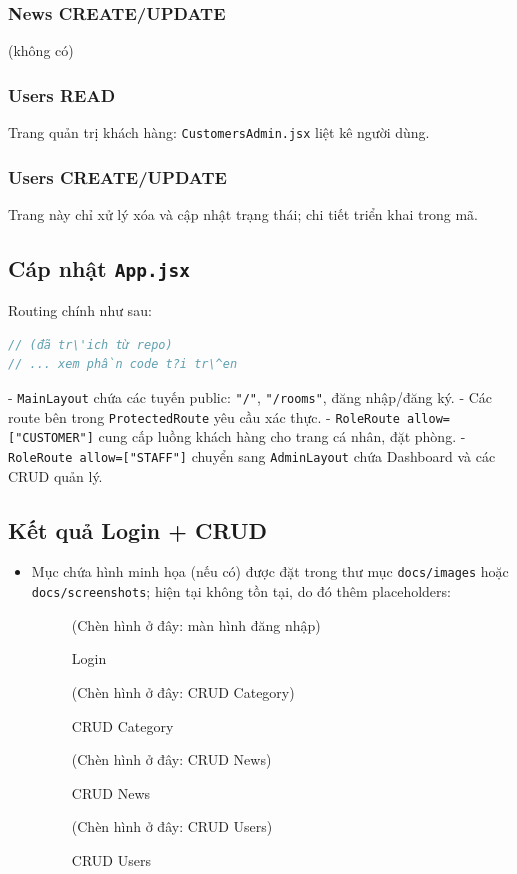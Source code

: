 \documentclass[12pt,a4paper]{article}
\begin{document}
\subsubsection{News CREATE/UPDATE}
(không có)
\subsubsection{Users READ}
Trang quản trị khách hàng: \texttt{CustomersAdmin.jsx} liệt kê người dùng.
\subsubsection{Users CREATE/UPDATE}
Trang này chỉ xử lý xóa và cập nhật trạng thái; chi tiết triển khai trong mã.

\subsection{C\'ap nhật \texttt{App.jsx}}
Routing chính như sau:
\begin{lstlisting}[language=JavaScript]
// (đã tr\'ich từ repo)
// ... xem phần code t?i tr\^en
\end{lstlisting}
- \texttt{MainLayout} chứa các tuyến public: \texttt{"/"}, \texttt{"/rooms"},
  đăng nhập/đăng ký.
- Các route bên trong \texttt{ProtectedRoute} yêu cầu xác thực.
- \texttt{RoleRoute allow={["CUSTOMER"]}} cung cấp luồng khách hàng cho
  trang cá nhân, đặt phòng.
- \texttt{RoleRoute allow={["STAFF"]}} chuyển sang \texttt{AdminLayout}
  chứa Dashboard và các CRUD quản lý.

\subsection{Kết quả Login + CRUD}
\begin{itemize}
    \item Mục chứa hình minh họa (nếu có) được đặt trong thư mục
    \texttt{docs/images} hoặc \texttt{docs/screenshots}; hiện tại không tồn tại,
    do đó thêm placeholders:
    \begin{figure}[h]
    \centering
    (Chèn hình ở đây: màn hình đăng nhập)
    \caption{Login}
    \end{figure}
    \begin{figure}[h]
    \centering
    (Chèn hình ở đây: CRUD Category)
    \caption{CRUD Category}
    \end{figure}
    \begin{figure}[h]
    \centering
    (Chèn hình ở đây: CRUD News)
    \caption{CRUD News}
    \end{figure}
    \begin{figure}[h]
    \centering
    (Chèn hình ở đây: CRUD Users)
    \caption{CRUD Users}
    \end{figure}
\end{itemize}
\end{document}
